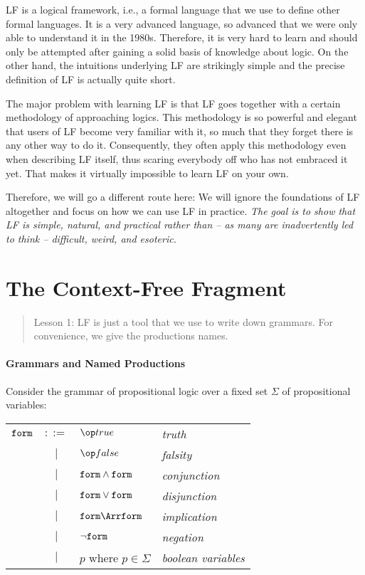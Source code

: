 LF \cite{lf,logicalframeworks} is a logical framework, i.e., a formal language that we use to define other formal languages. It is a very advanced language, so advanced that we were only able to understand it in the 1980s. Therefore, it is very hard to learn and should only be attempted after gaining a solid basis of knowledge about logic. On the other hand, the intuitions underlying LF are strikingly simple and the precise definition of LF is actually quite short.

The major problem with learning LF is that LF goes together with a certain methodology of approaching logics. This methodology is so powerful and elegant that users of LF become very familiar with it, so much that they forget there is any other way to do it. Consequently, they often apply this methodology even when describing LF itself, thus scaring everybody off who has not embraced it yet. That makes it virtually impossible to learn LF on your own.

Therefore, we will go a different route here: We will ignore the foundations of LF altogether and focus on how we can use LF in practice. \emph{The goal is to show that LF is simple, natural, and practical rather than -- as many are inadvertently led to think -- difficult, weird, and esoteric.}

\section{The Context-Free Fragment}

\begin{quote}
 Lesson 1: LF is just a tool that we use to write down grammars. For convenience, we give the productions names.
\end{quote}

\paragraph{Grammars and Named Productions}
Consider the grammar of propositional logic over a fixed set $\Sigma$ of propositional variables:

\begin{center}
\begin{tabular}{lcl@{\tb}l}
$\mathtt{form}$ & $::=$ & $\true$ & \emph{truth} \\
     &  $|$  & $\false$ & \emph{falsity} \\
     &  $|$  & $\mathtt{form} \wedge \mathtt{form}$ & \emph{conjunction} \\
     &  $|$  & $\mathtt{form} \vee \mathtt{form}$ & \emph{disjunction} \\
     &  $|$  & $\FORM \impl \FORM$ & \emph{implication} \\
     &  $|$  & $\neg \mathtt{form}$ & \emph{negation} \\
     &  $|$  & $p$ where $p\in\Sigma$ & \emph{boolean variables}\\
\end{tabular}
\end{center}

